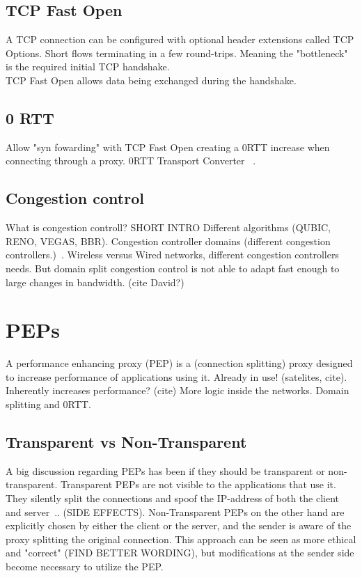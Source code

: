 \documentclass[a4paper,english, 11pt]{report}
\begin{document}
\subsection{TCP Fast Open}
A TCP connection can be configured with optional header extensions called TCP Options. 
Short flows terminating in a few round-trips. Meaning the "bottleneck" is the required initial TCP handshake.\\
TCP Fast Open allows data being exchanged during the handshake. 

\subsection{0 RTT}
Allow "syn fowarding" with TCP Fast Open creating a 0RTT increase when connecting through a proxy.
0RTT Transport Converter ~\cite{rfc8803}.

\subsection{Congestion control}
What is congestion controll? SHORT INTRO
Different algorithms (QUBIC, RENO, VEGAS, BBR).
Congestion controller domains (different congestion controllers.)~\cite{rfc5783}.
Wireless versus Wired networks, different congestion controllers needs.
But domain split congestion control is not able to adapt fast enough to large changes in bandwidth. (cite David?)


\section{PEPs}
A performance enhancing proxy (PEP) is a (connection splitting) proxy designed to increase performance of applications using it. Already in use! (satelites, cite). Inherently increases performance? (cite)
More logic inside the networks. Domain splitting and 0RTT.

\subsection{Transparent vs Non-Transparent}
A big discussion regarding PEPs has been if they should be transparent or non-transparent. Transparent PEPs are not visible to the applications that use it. They silently split the connections and spoof the IP-address of both the client and server~\cite{pep_dna}.. (SIDE EFFECTS). Non-Transparent PEPs on the other hand are explicitly chosen by either the client or the server, and the sender is aware of the proxy splitting the original connection. This approach can be seen as more ethical and "correct" (FIND BETTER WORDING), but modifications at the sender side become necessary to utilize the PEP.
\end{document}
